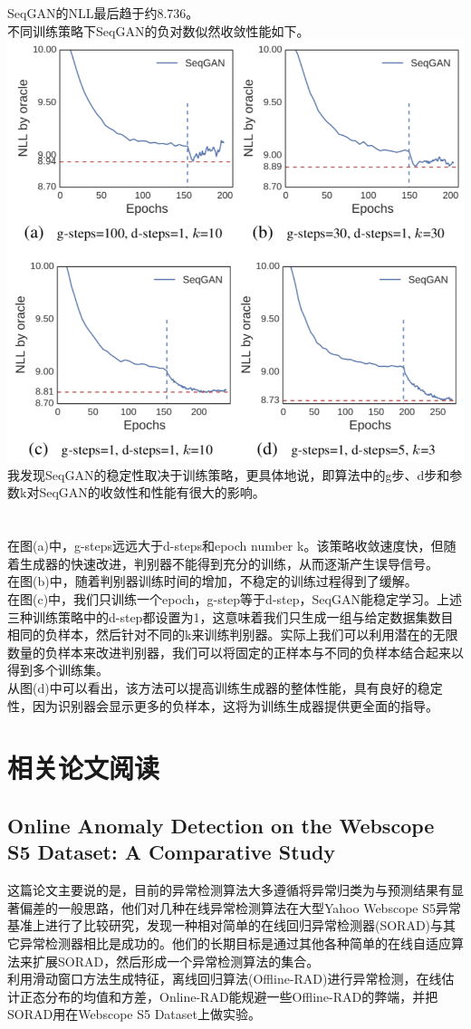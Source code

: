 \documentclass[11pt,a4paper]{ctexart}
\begin{document}
SeqGAN的NLL最后趋于约8.736。\\
不同训练策略下SeqGAN的负对数似然收敛性能如下。\\
\includegraphics[scale=1]{3.png}\\
我发现SeqGAN的稳定性取决于训练策略，更具体地说，即算法中的g步、d步和参数k对SeqGAN的收敛性和性能有很大的影响。\\\\\\
在图(a)中，g-steps远远大于d-steps和epoch number k。该策略收敛速度快，但随着生成器的快速改进，判别器不能得到充分的训练，从而逐渐产生误导信号。\\
在图(b)中，随着判别器训练时间的增加，不稳定的训练过程得到了缓解。\\
在图(c)中，我们只训练一个epoch，g-step等于d-step，SeqGAN能稳定学习。上述三种训练策略中的d-step都设置为1，这意味着我们只生成一组与给定数据集数目相同的负样本，然后针对不同的k来训练判别器。实际上我们可以利用潜在的无限数量的负样本来改进判别器，我们可以将固定的正样本与不同的负样本结合起来以得到多个训练集。\\
从图(d)中可以看出，该方法可以提高训练生成器的整体性能，具有良好的稳定性，因为识别器会显示更多的负样本，这将为训练生成器提供更全面的指导。
\section{相关论文阅读}
\subsection{Online Anomaly Detection on the Webscope S5 Dataset: A Comparative Study}
\noindent 这篇论文主要说的是，目前的异常检测算法大多遵循将异常归类为与预测结果有显著偏差的一般思路，他们对几种在线异常检测算法在大型Yahoo Webscope S5异常基准上进行了比较研究，发现一种相对简单的在线回归异常检测器(SORAD)与其它异常检测器相比是成功的。他们的长期目标是通过其他各种简单的在线自适应算法来扩展SORAD，然后形成一个异常检测算法的集合。\\
利用滑动窗口方法生成特征，离线回归算法(Offline-RAD)进行异常检测，在线估计正态分布的均值和方差，Online-RAD能规避一些Offline-RAD的弊端，并把SORAD用在Webscope S5 Dataset上做实验。
\end{document}
